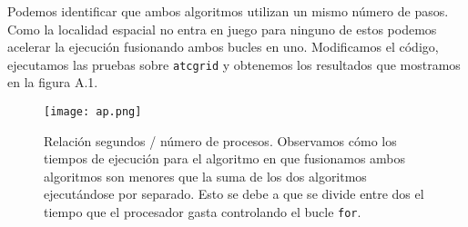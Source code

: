 Podemos identificar que ambos algoritmos utilizan un mismo número de pasos.
Como la localidad espacial no entra en juego para ninguno de estos podemos
acelerar la ejecución fusionando ambos bucles en uno. Modificamos el código,
ejecutamos las pruebas sobre \texttt{atcgrid} y obtenemos los resultados que
mostramos en la figura A.1.

\begin{figure}[H]
    \centering
    \texttt{[image: ap.png]}
    \caption{Relación segundos / número de procesos. Observamos cómo los tiempos de ejecución para
    el algoritmo en que fusionamos ambos algoritmos son menores que la suma de los dos algoritmos ejecutándose
    por separado. Esto se debe a que se divide entre dos el tiempo que el procesador gasta controlando el bucle
    \texttt{for}.}
\end{figure}